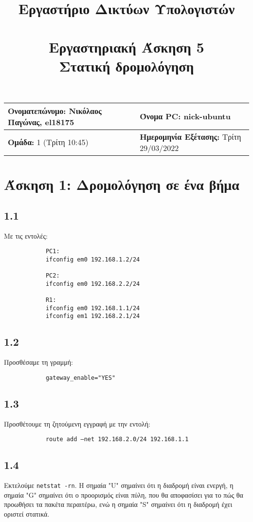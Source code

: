 \documentclass[a4paper, 12pt]{article}
\title{
	\textbf{Εργαστήριο Δικτύων Υπολογιστών} \\~\\
	Εργαστηριακή Άσκηση 5 \\ 
	Στατική δρομολόγηση
}
\author{}
\date{}
\begin{document}
\maketitle
\begin{center}
	\begin{tabular}{|l|l|}
		\hline
		\textbf{Ονοματεπώνυμο:} Νικόλαος Παγώνας, el18175  & \textbf{Όνομα PC:} nick-ubuntu \\
		\hline
		\textbf{Ομάδα:} 1 (Τρίτη 10:45) & \textbf{Ημερομηνία Εξέτασης:} Τρίτη 29/03/2022 \\
		\hline
	\end{tabular}
\end{center}

\section*{Άσκηση 1: Δρομολόγηση σε ένα βήμα}

	\subsection*{1.1}
		Με τις εντολές:
		
		\begin{verbatim}
			PC1: 
			ifconfig em0 192.168.1.2/24
			
			PC2: 
			ifconfig em0 192.168.2.2/24
			
			R1: 
			ifconfig em0 192.168.1.1/24
			ifconfig em1 192.168.2.1/24
		\end{verbatim}

	\subsection*{1.2}
		Προσθέσαμε τη γραμμή:
		
		\begin{verbatim}
			gateway_enable="YES"
		\end{verbatim}

	\subsection*{1.3}
		Προσθέτουμε τη ζητούμενη εγγραφή με την εντολή:
		
		\begin{verbatim}
			route add –net 192.168.2.0/24 192.168.1.1
		\end{verbatim}

	\subsection*{1.4}
		Εκτελούμε \verb|netstat -rn|. Η σημαία "U" σημαίνει ότι η διαδρομή είναι ενεργή, η σημαία "G" σημαίνει ότι ο προορισμός είναι πύλη, που θα αποφασίσει για το πώς θα προωθήσει τα πακέτα περαιτέρω, ενώ η σημαία "S" σημαίνει ότι η διαδρομή έχει οριστεί στατικά.
\end{document}
